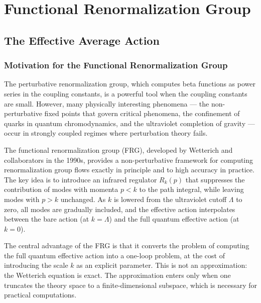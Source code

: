 \documentclass[11pt, twoside, openright]{book}
\theoremstyle{dotted}
\theoremstyle{definition}
\begin{document}
\part{Functional Renormalization Group}

\chapter{The Effective Average Action}
\label{ch:eff_avg_action}

\section{Motivation for the Functional Renormalization Group}

The perturbative renormalization group, which computes beta functions as power
series in the coupling constants, is a powerful tool when the coupling constants
are small. However, many physically interesting phenomena --- the non-perturbative
fixed points that govern critical phenomena, the confinement of quarks in quantum
chromodynamics, and the ultraviolet completion of gravity --- occur in strongly
coupled regimes where perturbation theory fails.

The functional renormalization group (FRG), developed by Wetterich and collaborators
in the 1990s, provides a non-perturbative framework for computing renormalization
group flows exactly in principle and to high accuracy in practice. The key idea is
to introduce an infrared regulator $R_k(p)$ that suppresses the contribution of
modes with momenta $p < k$ to the path integral, while leaving modes with $p > k$
unchanged. As $k$ is lowered from the ultraviolet cutoff $\Lambda$ to zero, all
modes are gradually included, and the effective action interpolates between the
bare action (at $k = \Lambda$) and the full quantum effective action (at $k = 0$).

The central advantage of the FRG is that it converts the problem of computing
the full quantum effective action into a one-loop problem, at the cost of
introducing the scale $k$ as an explicit parameter. This is not an approximation:
the Wetterich equation is exact. The approximation enters only when one truncates
the theory space to a finite-dimensional subspace, which is necessary for practical
computations.
\end{document}
